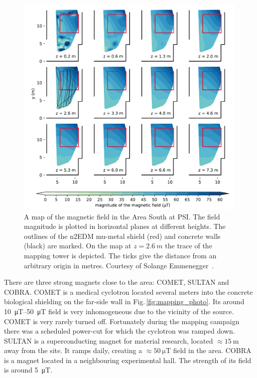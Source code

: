 \begin{figure}
  \centering
  \includegraphics[width=\linewidth]{gfx/mapping/Michals_plot.pdf}
  \caption{A map of the magnetic field in the Area South at PSI\@. The field magnitude is plotted in horizontal planes at different heights. The outlines of the n2EDM mu-metal shield (red) and concrete walls (black) are marked.
  On the map at $z = \SI{2.6}{m}$ the trace of the mapping tower is depicted.
  The ticks give the distance from an arbitrary origin in metres.
  Courtesy of Solange Emmenegger~\cite{EmmeneggerThesis}.}\label{fig:mapping_p-i_map}
\end{figure}

There are three strong magnets close to the area: COMET, SULTAN and COBRA\@.
COMET is a medical cyclotron located several meters into the concrete biological shielding on the far-side wall in Fig.\,\ref{fig:mapping_photo}.
Its around \SIrange[range-phrase=--,range-units=single]{10}{50}{\micro\tesla} field is very inhomogeneous due to the vicinity of the source.
COMET is very rarely turned off.
Fortunately during the mapping campaign there was a scheduled power-cut for which the cyclotron was ramped down.
SULTAN is a superconducting magnet for material research, located $\approx \SI{15}{\metre}$ away from the site.
It ramps daily, creating a $\approx \SI{50}{\micro\tesla}$ field in the area.
COBRA is a magnet located in a neighbouring experimental hall.
The strength of its field is around \SI{5}{\micro\tesla}.

